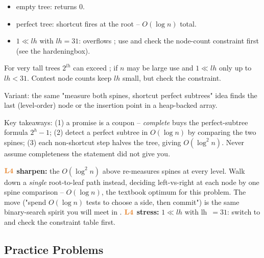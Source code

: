 \begin{itemize}[nosep]
  \item empty tree: returns $0$. \hfill{}
  \item perfect tree: shortcut fires at the root -- $O(\log n)$ total.
  \item $1 \ll lh$ with $lh=31$: overflows ; use  and check the
        node-count constraint first (see the hardeningbox).
\end{itemize}

\begin{warningbox}[$1 \ll lh$ overflow]
For very tall trees $2^{lh}$ can exceed ; if $n$ may be large use  and $1\ll lh$ only up to $lh<31$. Contest node counts keep $lh$ small, but check the
constraint.
\end{warningbox}
Variant: the same "measure both spines, shortcut perfect subtrees" idea finds the last
(level-order) node or the insertion point in a heap-backed array.

\begin{insightbox}
Key takeaways: (1) a promise is a coupon -- \emph{complete} buys the perfect-subtree
formula $2^{h}-1$; (2) detect a perfect subtree in $O(\log n)$ by comparing the two
spines; (3) each non-shortcut step halves the tree, giving $O(\log^2 n)$. Never assume
completeness the statement did not give you.
\end{insightbox}

\begin{hardeningbox}
\textbf{$\lv4$ sharpen:} the $O(\log^2 n)$ above re-measures spines at every level. Walk
down a \emph{single} root-to-leaf path instead, deciding left-vs-right at each node by
one spine comparison -- $O(\log n)$, the textbook optimum for this problem. The move
("spend $O(\log n)$ tests to choose a side, then commit") is the same binary-search
spirit you will meet in . \textbf{$\lv4$ stress:} $1 \ll lh$ with
lh~$=31$: switch to  and check the constraint table first.
\end{hardeningbox}

\subsection{Practice Problems}

